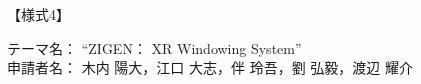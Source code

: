 \documentclass[uplatex]{jsarticle}
\begin{document}
\begin{flushright}
  【様式4】
\end{flushright}
テーマ名： ``ZIGEN： XR Windowing System'' \\
申請者名： 木内 陽大，江口 大志，伴 玲吾，劉 弘毅，渡辺 耀介














\end{document}
